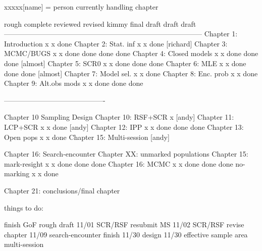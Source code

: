 xxxxx[name] = person currently handling chapter


                          rough   complete reviewed  revised kimmy final 
                          draft    draft                           draft
------------------------------------------------------------------------------------
Chapter 1: Introduction       x       x     done    
Chapter 2: Stat. inf          x       x     done    [richard]
Chapter 3: MCMC/BUGS          x       x     done     done    done   done
Chapter 4: Closed models      x       x     done     done    done   [almost]
Chapter 5: SCR0               x       x     done     done    done
Chapter 6: MLE                x       x     done     done    done   [almost]
Chapter 7: Model sel.         x       x     done   
Chapter 8: Enc. prob          x       x     done
Chapter 9: Alt.obs mods       x       x     done     done    done

-------------------------------------------

Chapter 10 Sampling Design
Chapter 10: RSF+SCR           x    [andy]
Chapter 11: LCP+SCR           x       x     done    [andy]
Chapter 12: IPP               x       x     done     done           done
Chapter 13: Open pops         x       x     done 
Chapter 15: Multi-session     [andy]


Chapter 16: Search-encounter
Chapter XX: unmarked populations
Chapter 15: mark-resight      x       x     done     done           done
Chapter 16: MCMC              x       x     done     done           done
no-marking                    x       x     done

Chapter 21: conclusions/final chapter





things to do:

finish GoF rough draft   11/01
SCR/RSF resubmit MS      11/02
SCR/RSF revise chapter   11/09
search-encounter finish  11/30
design                   11/30
effective sample area  
multi-session
